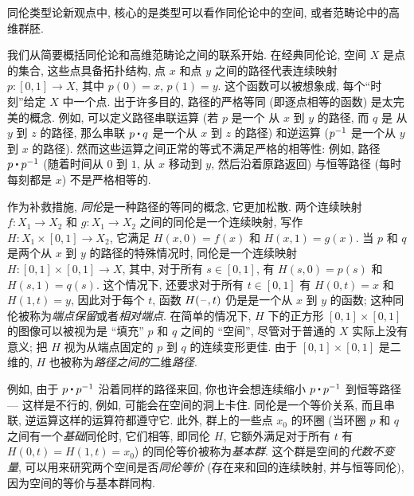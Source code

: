 同伦类型论新观点中, 核心的是类型可以看作同伦论中的空间, 或者范畴论中的高维群胚.

我们从简要概括同伦论和高维范畴论之间的联系开始.
在经典同伦论, 空间 $X$ 是点的集合, 这些点具备拓扑结构,
%
%
点 $x$ 和点 $y$ 之间的路径代表连续映射 $p : [0,1] \to X$, 其中 $p(0) = x$, $p(1) = y$.
%
%
这个函数可以被想象成, 每个``时刻''给定 $X$ 中一个点.
出于许多目的, 路径的严格等同 (即逐点相等的函数) 是太完美的概念.
例如, 可以定义路径串联运算 (若 $p$ 是一个 从 $x$ 到 $y$ 的路径, 而 $q$ 是 从 $y$ 到 $z$ 的路径, 那么串联 $p \ct q$ 是一个从 $x$ 到 $z$ 的路径) 和逆运算 ($\mathord{{p}^{-1}}$ 是一个从 $y$ 到 $x$ 的路径).
然而这些运算之间正常的等式不满足严格的相等性: 例如, 路径 $p \ct \opp p$ (随着时间从 $0$ 到 $1$, 从 $x$ 移动到 $y$, 然后沿着原路返回) 与恒等路径 (每时每刻都是 $x$) 不是严格相等的.

作为补救措施, \emph{同伦}是一种路径的等同的概念, 它更加松散.
两个连续映射 $f : X_1 \to X_2$ 和 $g : X_1\to X_2$ 之间的同伦是一个连续映射, 写作 $H : X_1 \times [0, 1] \to X_2$, 它满足 $H(x, 0) = f (x)$ 和 $H(x, 1) = g(x)$.
当 $p$ 和 $q$ 是两个从 $x$ 到 $y$ 的路径的特殊情况时, 同伦是一个连续映射 $H : [0,1] \times [0,1] \rightarrow X$, 其中, 对于所有 $s\in [0,1]$, 有 $H(s,0) = p(s)$ 和 $H(s,1) = q(s)$.
这个情况下, 还要求对于所有 $t\in [0,1]$ 有 $H(0,t) = x$ 和 $H(1,t)=y$, 因此对于每个 $t$, 函数 $H(\mathord{\hspace{1pt}\text{--}\hspace{1pt}},t)$ 仍是是一个从 $x$ 到 $y$ 的函数;
这种同伦被称为\emph{端点保留}或者\emph{相对端点}.
在简单的情况下, $H$ 下的正方形 $[0,1]\times [0,1]$ 的图像可以被视为是 ``填充''  $p$ 和 $q$ 之间的 ``空间'', 尽管对于普通的 $X$ 实际上没有意义;
把 $H$ 视为从端点固定的 $p$ 到 $q$ 的连续变形更佳.
由于 $[0,1]\times [0,1]$ 是二维的, $H$ 也被称为\emph{路径之间的}二维\emph{路径}.

例如, 由于 $p \ct \opp p$ 沿着同样的路径来回, 你也许会想连续缩小 $p \ct \opp p$ 到恒等路径 --- 这样是不行的, 例如, 可能会在空间的洞上卡住.
同伦是一个等价关系, 而且串联, 逆运算这样的运算符都遵守它.
此外, 群上的一些点 $x_0$ 的环圈 (当环圈 $p$ 和 $q$ 之间有一个\emph{基础}同伦时, 它们相等, 即同伦 $H$, 它额外满足对于所有 $t$ 有 $H(0,t) = H(1,t) = x_0$) 的同伦等价被称为\emph{基本群}.
%
这个群是空间的\emph{代数不变量}, 可以用来研究两个空间是否\emph{同伦等价} (存在来和回的连续映射, 并与恒等同伦), 因为空间的等价与基本群同构.

